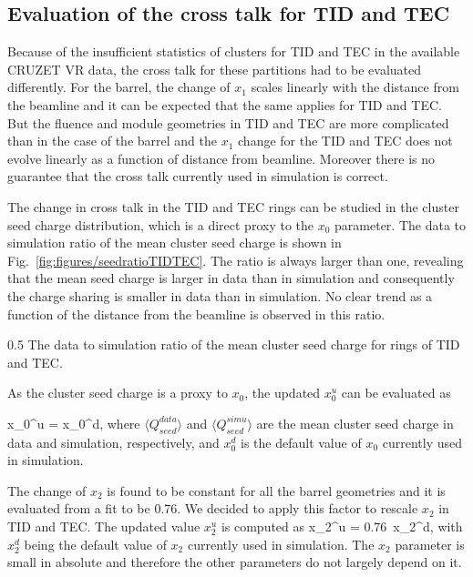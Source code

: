 \subsection{Evaluation of the cross talk for TID and TEC~\label{sec:tuning}}



Because of the insufficient statistics of clusters for TID and TEC in the available CRUZET VR data, the cross talk for these partitions had to be evaluated differently. For the barrel, the change of $x_{1}$ scales linearly with the distance from the beamline and it can be expected that the same applies for TID and TEC. But the fluence and module geometries in TID and TEC are more complicated than in the case of the barrel and the $x_{1}$ change for the TID and TEC does not evolve linearly as a function of distance from beamline. Moreover there is no guarantee that the cross talk currently used in simulation is correct.  

The change in cross talk in the TID and TEC rings can be studied in the cluster seed charge distribution, which is a direct proxy to the $x_{0}$ parameter. The data to simulation ratio of the mean cluster seed charge is shown in Fig.~\ref{fig:figures/seedratioTIDTEC}. The ratio is always larger than one, revealing that the mean seed charge is larger in data than in simulation and consequently the charge sharing is smaller in data than in simulation. No clear trend as a function of the distance from the beamline is observed in this ratio.

                 {0.5}       %
                 {The data to simulation ratio of the mean cluster seed charge for rings of TID and TEC.}

As the cluster seed charge is a proxy to $x_{0}$, the updated $x_{0}^{u}$ can be evaluated as

{
x_{0}^{u} = x_{0}^{d},
}
where $\langle Q_{seed}^{data} \rangle$ and $\langle Q_{seed}^{simu} \rangle$ are the mean cluster seed charge in data and simulation, respectively, and $x_{0}^{d}$ is the default value of $x_{0}$ currently used in simulation. 

The change of $x_{2}$ is found to be constant for all the barrel geometries and it is evaluated from a fit to be 0.76. We decided to apply this factor to rescale $x_{2}$ in TID and TEC. The updated value $x_{2}^{u}$ is computed as 
{
x_{2}^{u} = 0.76~x_{2}^{d},
}
with  $x_{2}^{d}$ being the default value of $x_{2}$ currently used in simulation. The $x_{2}$ parameter is small in absolute and therefore the other parameters do not largely depend on it. 

